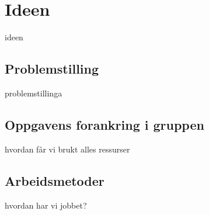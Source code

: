 \chapter {Ideen}
ideen

\section{Problemstilling}
problemstillinga

\section{Oppgavens forankring i gruppen}
hvordan får vi brukt alles ressurser

\section{Arbeidsmetoder}
hvordan har vi jobbet?
